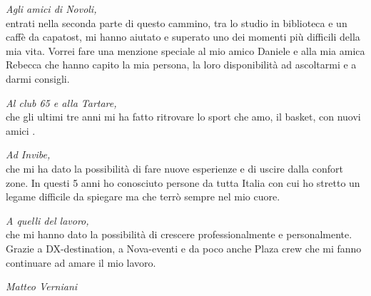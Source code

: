 \documentclass[twoside]{article}
\begin{document}
\textit{Agli amici di Novoli,}\\
entrati nella seconda parte di questo cammino, tra lo studio in biblioteca e un caffè da capatost, mi hanno aiutato e superato uno dei momenti più difficili della mia vita. Vorrei fare una menzione speciale al mio amico Daniele e alla mia amica Rebecca che hanno capito la mia persona, la loro disponibilità ad ascoltarmi e a darmi consigli. 

\vspace{\baselineskip}

\textit{Al club 65 e alla Tartare,}\\
che gli ultimi tre anni mi ha fatto ritrovare lo sport che amo, il basket, con nuovi amici . 

\vspace{\baselineskip}

\textit{Ad Invibe,}\\
che mi ha dato la possibilità di fare nuove esperienze e di uscire dalla confort zone. In questi 5 anni ho conosciuto persone da tutta Italia con cui ho stretto un legame difficile da spiegare ma che terrò sempre nel mio cuore.
\vspace{\baselineskip}

\textit{A quelli del lavoro,}\\
che mi hanno dato la possibilità di crescere professionalmente e personalmente. Grazie a DX-destination, a Nova-eventi e da poco anche Plaza crew che mi fanno continuare ad amare il mio lavoro.

\vspace{\baselineskip}

\begin{flushright}
\textit{Matteo Verniani}
\end{flushright}


\newpage
\mbox{}
\newpage

\newpage
\mbox{}
\newpage

\newpage
\mbox{}
\newpage

\newpage
\mbox{}
\newpage

\newpage
\mbox{}
\newpage

\end{document}
